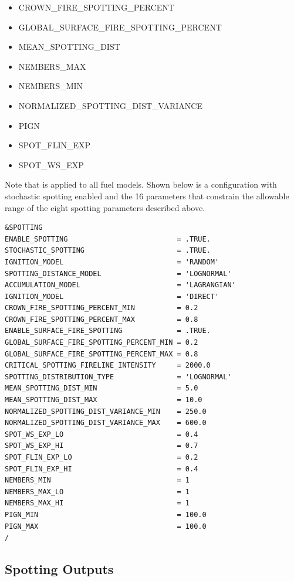 \begin{itemize}
    \item CROWN\_FIRE\_SPOTTING\_PERCENT
    \item GLOBAL\_SURFACE\_FIRE\_SPOTTING\_PERCENT
    \item MEAN\_SPOTTING\_DIST
    \item NEMBERS\_MAX
    \item NEMBERS\_MIN
    \item NORMALIZED\_SPOTTING\_DIST\_VARIANCE
    \item PIGN
    \item SPOT\_FLIN\_EXP
    \item SPOT\_WS\_EXP
\end{itemize}

Note that  is applied to all fuel models. Shown below is a  configuration with stochastic spotting enabled and the 16 parameters that constrain the allowable range of the eight spotting parameters described above.

\begin{verbatim}
&SPOTTING
ENABLE_SPOTTING                          = .TRUE.
STOCHASTIC_SPOTTING                      = .TRUE.
IGNITION_MODEL                           = 'RANDOM'
SPOTTING_DISTANCE_MODEL                  = 'LOGNORMAL'
ACCUMULATION_MODEL                       = 'LAGRANGIAN'
IGNITION_MODEL                           = 'DIRECT'
CROWN_FIRE_SPOTTING_PERCENT_MIN          = 0.2
CROWN_FIRE_SPOTTING_PERCENT_MAX          = 0.8
ENABLE_SURFACE_FIRE_SPOTTING             = .TRUE.
GLOBAL_SURFACE_FIRE_SPOTTING_PERCENT_MIN = 0.2
GLOBAL_SURFACE_FIRE_SPOTTING_PERCENT_MAX = 0.8
CRITICAL_SPOTTING_FIRELINE_INTENSITY     = 2000.0
SPOTTING_DISTRIBUTION_TYPE               = 'LOGNORMAL'
MEAN_SPOTTING_DIST_MIN                   = 5.0
MEAN_SPOTTING_DIST_MAX                   = 10.0
NORMALIZED_SPOTTING_DIST_VARIANCE_MIN    = 250.0
NORMALIZED_SPOTTING_DIST_VARIANCE_MAX    = 600.0
SPOT_WS_EXP_LO                           = 0.4
SPOT_WS_EXP_HI                           = 0.7
SPOT_FLIN_EXP_LO                         = 0.2
SPOT_FLIN_EXP_HI                         = 0.4
NEMBERS_MIN                              = 1
NEMBERS_MAX_LO                           = 1
NEMBERS_MAX_HI                           = 1
PIGN_MIN                                 = 100.0
PIGN_MAX                                 = 100.0
/
\end{verbatim}

\subsection{Spotting Outputs}
\label{spotting_outputs}


